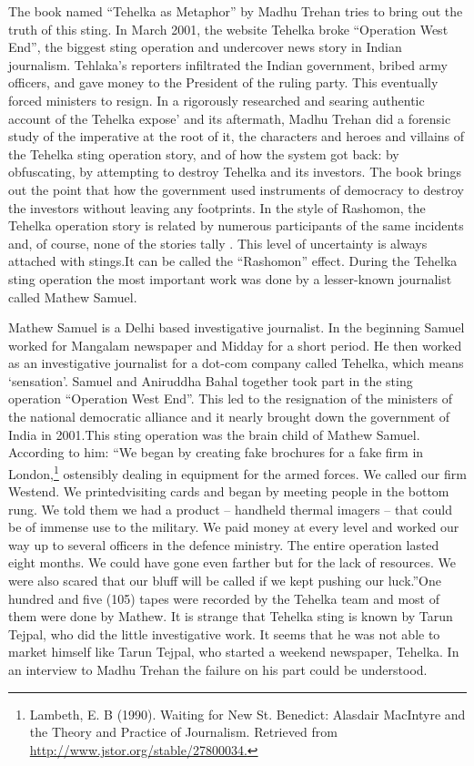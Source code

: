 \begin{multicols}{2}
\noi
The book named “Tehelka as Metaphor” by Madhu Trehan tries to bring out the truth of this
sting. In March 2001, the website Tehelka broke “Operation West End”, the biggest sting
operation and undercover news story in Indian journalism. Tehlaka’s reporters infiltrated the
Indian government, bribed army officers, and gave money to the President of the ruling party.
This eventually forced ministers to resign. In a rigorously researched and searing authentic
account of the Tehelka expose’ and its aftermath, Madhu Trehan did a forensic study of the
imperative at the root of it, the characters and heroes and villains of the Tehelka sting operation
story, and of how the system got back: by obfuscating, by attempting to destroy Tehelka and
its investors. The book brings out the point that how the government used instruments of
democracy to destroy the investors without leaving any footprints. In the style of Rashomon,
the Tehelka operation story is related by numerous participants of the same incidents and, of
course, none of the stories tally . This level of uncertainty is always attached with stings.It can
be called the “Rashomon” effect. During the Tehelka sting operation the most important work
was done by a lesser-known journalist called Mathew Samuel.

\vspace{-.2cm}

\noi
Mathew Samuel is a Delhi based investigative journalist. In the beginning Samuel worked for
Mangalam newspaper and Midday for a short period. He then worked as an investigative
journalist for a dot-com company called Tehelka, which means ‘sensation’. Samuel and
Aniruddha Bahal together took part in the sting operation “Operation West End”. This led to
the resignation of the ministers of the national democratic alliance and it nearly brought down
the government of India in 2001.This sting operation was the brain child of Mathew Samuel.
According to him: “We began by creating fake brochures for a fake firm in London,\footnote{Lambeth, E. B (1990). Waiting for New St. Benedict: Alasdair MacIntyre and the Theory and Practice of Journalism. Retrieved from \url{http://www.jstor.org/stable/27800034.}} ostensibly dealing in equipment for the armed forces. We called our firm Westend. We printedvisiting cards and began by meeting people in the bottom rung. We told them we had a product – handheld thermal imagers – that could be of immense use to the military. We paid money at
every level and worked our way up to several officers in the defence ministry. The entire
operation lasted eight months. We could have gone even farther but for the lack of resources.
We were also scared that our bluff will be called if we kept pushing our luck.”One hundred and
five (105) tapes were recorded by the Tehelka team and most of them were done by Mathew.
It is strange that Tehelka sting is known by Tarun Tejpal, who did the little investigative work.
It seems that he was not able to market himself like Tarun Tejpal, who started a weekend
newspaper, Tehelka. In an interview to Madhu Trehan the failure on his part could be
understood.


\end{multicols}
